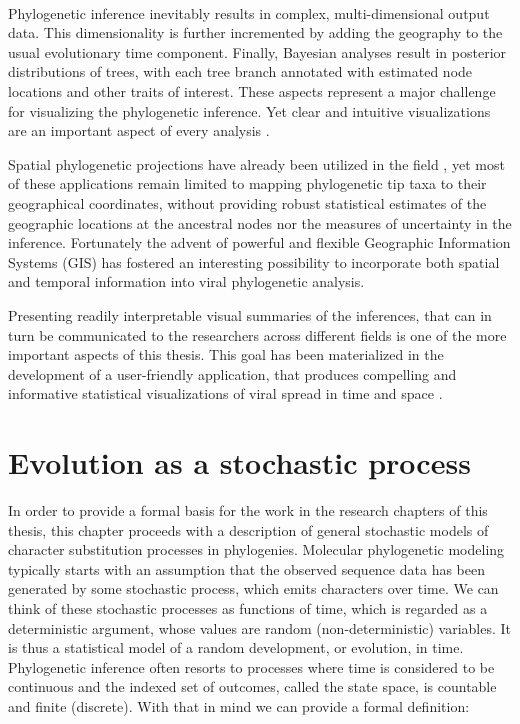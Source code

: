 \paragraph{}
Phylogenetic inference inevitably results in complex, multi-dimensional output data.
This dimensionality is further incremented by adding the geography to the usual evolutionary time component.
Finally, Bayesian analyses result in posterior distributions of trees, with each tree branch annotated with estimated node locations and other traits of interest.
These aspects represent a major challenge for visualizing the phylogenetic inference.
Yet clear and intuitive visualizations are an important aspect of every analysis \citep{Hadley2010}.

Spatial phylogenetic projections have already been utilized in the field \citep{Kidd2006,Parks2009}, yet most of these applications remain limited to mapping phylogenetic tip taxa to their geographical coordinates, without providing robust statistical estimates of the geographic locations at the ancestral nodes nor the measures of uncertainty in the inference.
Fortunately the advent of powerful and flexible Geographic Information Systems (GIS) has fostered an interesting possibility to incorporate both spatial and temporal information into viral phylogenetic analysis.

Presenting readily interpretable visual summaries of the inferences, that can in turn be communicated to the researchers across different fields is one of the more important aspects of this thesis.
This goal has been materialized in the development of a user-friendly application, that produces compelling and informative statistical visualizations of viral spread in time and space \citep{Bielejec2011}.

\section{Evolution as a stochastic process}

In order to provide a formal basis for the work in the research chapters of this thesis, this chapter proceeds with a description of general stochastic models of character substitution processes in phylogenies. 
Molecular phylogenetic modeling typically starts with an assumption that the observed sequence data has been generated by some stochastic process, which emits characters over time.
We can think of these stochastic processes as functions of time, which is regarded as a deterministic argument, whose values are random (non-deterministic) variables. 
It is thus a statistical model of a random development, or evolution, in time.
Phylogenetic inference often resorts to processes where time is considered to be continuous and the indexed set of outcomes, called the state space, is countable and finite (discrete).
With that in mind we can provide a formal definition:

